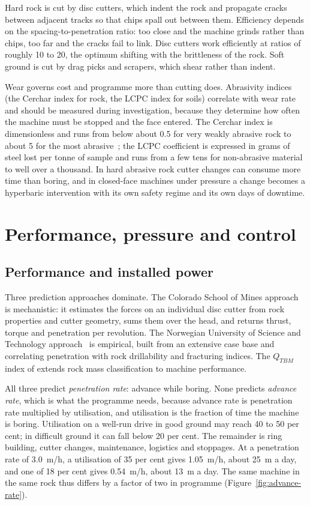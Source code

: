 Hard rock is cut by disc cutters, which indent the rock and propagate cracks
between adjacent tracks so that chips spall out between them. Efficiency
depends on the spacing-to-penetration ratio: too close and the machine grinds
rather than chips, too far and the cracks fail to link. Disc cutters work
efficiently at ratios of roughly 10 to 20, the optimum shifting with the
brittleness of the rock. Soft ground is cut by
drag picks and scrapers, which shear rather than indent.

Wear governs cost and programme more than cutting does. Abrasivity indices
(the Cerchar index for rock, the LCPC index for soils) correlate with wear
rate and should be measured during investigation, because they determine how
often the machine must be stopped and the face entered. The Cerchar index is
dimensionless and runs from below about 0.5 for very weakly abrasive rock to
about 5 for the most abrasive~\citep{alber2014cerchar}; the LCPC coefficient is expressed in grams of
steel lost per tonne of sample and runs from a few tens for non-abrasive
material to well over a thousand. In hard abrasive rock
cutter changes can consume more time than boring, and in closed-face machines
under pressure a change becomes a hyperbaric intervention with its own safety
regime and its own days of downtime.

\section{Performance, pressure and control}
\label{sec:performance-pressure}

\subsection{Performance and installed power}
\label{sec:performance-power}

Three prediction approaches dominate. The Colorado School of Mines approach~\citep{rostami1993csm} is
mechanistic: it estimates the forces on an individual disc cutter from rock
properties and cutter geometry, sums them over the head, and returns thrust,
torque and penetration per revolution. The Norwegian University of Science and
Technology approach~\citep{bruland1998ntnu} is empirical, built from an extensive case base and
correlating penetration with rock drillability and fracturing indices. The
$Q_{TBM}$ index of \citet{barton2000tbm} extends rock mass classification to
machine performance.

All three predict \emph{penetration rate}: advance while boring. None
predicts \emph{advance rate}, which is what the programme needs, because
advance rate is penetration rate multiplied by utilisation, and utilisation is
the fraction of time the machine is boring. Utilisation on a
well-run drive in good ground may reach 40 to 50 per cent; in difficult ground
it can fall below 20 per cent. The remainder is ring building, cutter changes,
maintenance, logistics and stoppages. At a penetration rate of 3.0~m/h, a
utilisation of 35 per cent gives 1.05~m/h, about 25~m a day, and one of 18
per cent gives 0.54~m/h, about 13~m a day. The same machine in the same rock
thus differs by a factor of two in programme (Figure~\ref{fig:advance-rate}).


